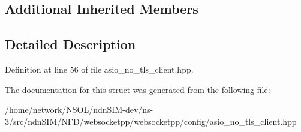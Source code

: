 \subsection*{Additional Inherited Members}


\subsection{Detailed Description}


Definition at line 56 of file asio\+\_\+no\+\_\+tls\+\_\+client.\+hpp.



The documentation for this struct was generated from the following file\+:\begin{DoxyCompactItemize}
\item 
/home/network/\+N\+S\+O\+L/ndn\+S\+I\+M-\/dev/ns-\/3/src/ndn\+S\+I\+M/\+N\+F\+D/websocketpp/websocketpp/config/asio\+\_\+no\+\_\+tls\+\_\+client.\+hpp\end{DoxyCompactItemize}
